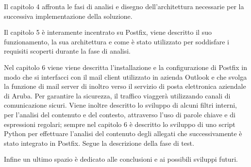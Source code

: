 Il capitolo 4 affronta le fasi di analisi e disegno dell'architettura necessarie 
per la successiva implementazione della soluzione.

Il capitolo 5 è interamente incentrato su Postfix, viene descritto il suo funzionamento, 
la sua architettura e come è stato utilizzato per soddisfare i requisiti scoperti durante la fase di analisi.

Nel capitolo 6 viene viene descritta l'installazione e la configurazione di Postfix in modo che si interfacci con
il mail client utilizzato in azienda Outlook e che svolga la funzione di mail server di inoltro verso il servizio
di posta elettronica aziendale di Aruba.
Per garantire la sicurezza, il traffico viaggerà utilizzando canali di comunicazione sicuri.
Viene inoltre descritto lo sviluppo di alcuni filtri interni, per l'analisi del contenuto e del contesto,
attraverso l'uso di parole chiave e di espressioni regolari;
sempre nel capitolo 6 è descritto lo sviluppo di uno script Python per effettuare l'analisi del contenuto 
degli allegati 
che successivamente è stato integrato in Postfix. Segue la descrizione della fase di test. 

Infine un ultimo spazio è dedicato alle conclusioni e ai possibili sviluppi futuri.




